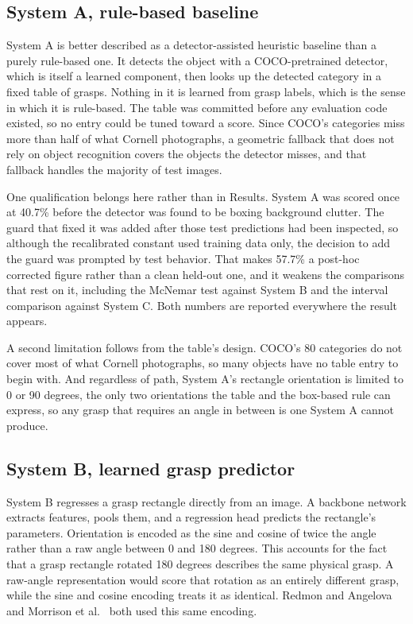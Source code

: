 \documentclass[12pt,letterpaper]{article}
\begin{document}
\subsection{System A, rule-based baseline}

System A is better described as a detector-assisted heuristic baseline
than a purely rule-based one. It detects the object with a
COCO-pretrained detector, which is itself a learned component, then
looks up the detected category in a fixed table of grasps. Nothing in
it is learned from grasp labels, which is the sense in which it is
rule-based. The table was committed before any evaluation code existed,
so no entry could be tuned toward a score. Since COCO's categories miss
more than half of what Cornell photographs, a geometric fallback that
does not rely on object recognition covers the objects the detector
misses, and that fallback handles the majority of test images.

One qualification belongs here rather than in Results. System A was
scored once at 40.7\% before the detector was found to be boxing
background clutter. The guard that fixed it was added after those test
predictions had been inspected, so although the recalibrated constant
used training data only, the decision to add the guard was prompted by
test behavior. That makes 57.7\% a post-hoc corrected figure rather
than a clean held-out one, and it weakens the comparisons that rest on
it, including the McNemar test against System B and the interval
comparison against System C. Both numbers are reported everywhere the
result appears.

A second limitation follows from the table's design. COCO's 80
categories do not cover most of what Cornell photographs, so many
objects have no table entry to begin with. And regardless of path,
System A's rectangle orientation is limited to 0 or 90 degrees, the
only two orientations the table and the box-based rule can express, so
any grasp that requires an angle in between is one System A cannot
produce.

\subsection{System B, learned grasp predictor}

System B regresses a grasp rectangle directly from an image. A backbone
network extracts features, pools them, and a regression head predicts
the rectangle's parameters. Orientation is encoded as the sine and
cosine of twice the angle rather than a raw angle between 0 and 180
degrees. This accounts for the fact that a grasp rectangle rotated 180
degrees describes the same physical grasp. A raw-angle representation
would score that rotation as an entirely different grasp, while the
sine and cosine encoding treats it as identical. Redmon and Angelova~\cite{redmon2015} and Morrison et al.~\cite{morrison2018} both used this same encoding.
\end{document}
